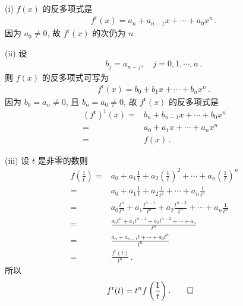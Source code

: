 \begin{pf}
    (i) $f(x)$ 的反多项式是
    \begin{align*}
        f^{\mathrm{r}} (x) = a_n + a_{n-1} x + \cdots + a_0 x^n \period
    \end{align*}
    因为 $a_0 \neq 0$, 故 $f^{\mathrm{r}} (x)$ 的次仍为 $n$\period

    (ii) 设
    \begin{align*}
        b_j = a_{n - j}, \quad j = 0,1,\cdots,n \period
    \end{align*}
    则 $f(x)$ 的反多项式可写为
    \begin{align*}
        f^{\mathrm{r}} (x) = b_0 + b_1 x + \cdots + b_n x^n \period
    \end{align*}
    因为 $b_0 = a_n \neq 0$, 且 $b_n = a_0 \neq 0$, 故 $f^{\mathrm{r}}(x)$ 的反多项式是
    \begin{align*}
        (f^{\mathrm{r}})^{\mathrm{r}} (x)
        = {} & b_n + b_{n-1} x + \cdots + b_0 x^n \\
        = {} & a_0 + a_1 x + \cdots + a_n x^n     \\
        = {} & f(x) \period
    \end{align*}

    (iii) 设 $t$ 是非零的数\period 则
    \begin{align*}
        f \left( \frac{1}{t} \right)
        = {} & a_0 + a_1 \frac{1}{t} + a_2 \left( \frac{1}{t} \right)^2 + \cdots + a_n \left( \frac{1}{t} \right)^n \\
        = {} & a_0 + a_1 \frac{1}{t} + a_2 \frac{1}{t^2} + \cdots + a_n \frac{1}{t^n}                               \\
        = {} & a_0 \frac{t^n}{t^n} + a_1 \frac{t^{n-1}}{t^n} + a_2 \frac{t^{n-2}}{t^n} + \cdots + a_n \frac{1}{t^n} \\
        = {} & \frac{a_0 t^n + a_1 t^{n-1} + a_2 t^{n-2} + \cdots + a_n}{t^n}                                       \\
        = {} & \frac{a_n + a_{n-1} t + \cdots + a_0 t^n}{t^n}                                                       \\
        = {} & \frac{f^{\mathrm{r}} (t)}{t^n} \period
    \end{align*}
    所以
    \begin{align*}
         & f^{\mathrm{r}} (t) = t^n f \left( \frac{1}{t} \right) . \qedhere
    \end{align*}
\end{pf}

